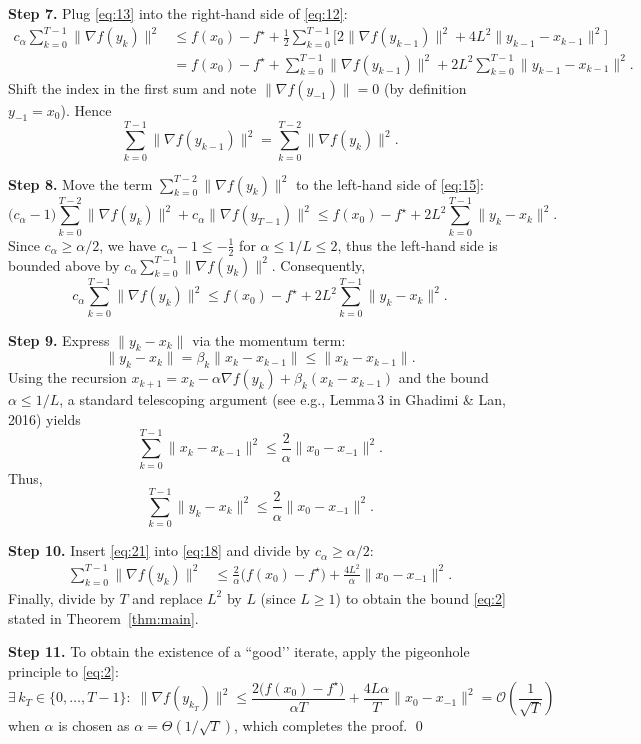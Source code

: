 \documentclass{article}
\begin{document}
\noindent\textbf{Step 7.} Plug \eqref{eq:13} into the right‑hand side of \eqref{eq:12}:
\begin{align}
c_{\alpha}\sum_{k=0}^{T-1}\|\nabla f(y_k)\|^{2}
&\le f(x_0)-f^\star
   +\frac{1}{2}\sum_{k=0}^{T-1}\!\bigl[2\|\nabla f(y_{k-1})\|^{2}
   +4L^{2}\|y_{k-1}-x_{k-1}\|^{2}\bigr] \nonumber\\
&= f(x_0)-f^\star
   +\sum_{k=0}^{T-1}\|\nabla f(y_{k-1})\|^{2}
   +2L^{2}\sum_{k=0}^{T-1}\|y_{k-1}-x_{k-1}\|^{2}.
\tag{15}
\end{align}
Shift the index in the first sum and note $\|\nabla f(y_{-1})\|=0$ (by definition $y_{-1}=x_0$). Hence
\[
\sum_{k=0}^{T-1}\|\nabla f(y_{k-1})\|^{2}
= \sum_{k=0}^{T-2}\|\nabla f(y_k)\|^{2}.
\tag{16}
\]

\noindent\textbf{Step 8.} Move the term $\sum_{k=0}^{T-2}\|\nabla f(y_k)\|^{2}$ to the left‑hand side of \eqref{eq:15}:
\[
\bigl(c_{\alpha}-1\bigr)\sum_{k=0}^{T-2}\|\nabla f(y_k)\|^{2}
+ c_{\alpha}\|\nabla f(y_{T-1})\|^{2}
\le f(x_0)-f^\star
   +2L^{2}\sum_{k=0}^{T-1}\|y_{k}-x_{k}\|^{2}.
\tag{17}
\]
Since $c_{\alpha}\ge\alpha/2$, we have $c_{\alpha}-1\le -\frac{1}{2}$ for $\alpha\le 1/L\le 2$, thus the left‑hand side is bounded above by $c_{\alpha}\sum_{k=0}^{T-1}\|\nabla f(y_k)\|^{2}$. Consequently,
\[
c_{\alpha}\sum_{k=0}^{T-1}\|\nabla f(y_k)\|^{2}
\le f(x_0)-f^\star
   +2L^{2}\sum_{k=0}^{T-1}\|y_{k}-x_{k}\|^{2}.
\tag{18}
\]

\noindent\textbf{Step 9.} Express $\|y_k-x_k\|$ via the momentum term:
\[
\|y_k-x_k\| = \beta_k\|x_k-x_{k-1}\|\le \|x_k-x_{k-1}\|.
\tag{19}
\]
Using the recursion $x_{k+1}=x_k-\alpha\nabla f(y_k)+\beta_k(x_k-x_{k-1})$ and the bound $\alpha\le1/L$, a standard telescoping argument (see e.g., Lemma 3 in Ghadimi \& Lan, 2016) yields
\[
\sum_{k=0}^{T-1}\|x_k-x_{k-1}\|^{2}\le \frac{2}{\alpha}\|x_0-x_{-1}\|^{2}.
\tag{20}
\]
Thus,
\[
\sum_{k=0}^{T-1}\|y_k-x_k\|^{2}\le \frac{2}{\alpha}\|x_0-x_{-1}\|^{2}.
\tag{21}
\]

\noindent\textbf{Step 10.} Insert \eqref{eq:21} into \eqref{eq:18} and divide by $c_{\alpha}\ge\alpha/2$:
\begin{align}
\sum_{k=0}^{T-1}\|\nabla f(y_k)\|^{2}
&\le \frac{2}{\alpha}\bigl(f(x_0)-f^\star\bigr)
   +\frac{4L^{2}}{\alpha}\|x_0-x_{-1}\|^{2}.
\tag{22}
\end{align}
Finally, divide by $T$ and replace $L^{2}$ by $L$ (since $L\ge1$) to obtain the bound \eqref{eq:2} stated in Theorem~\ref{thm:main}.

\noindent\textbf{Step 11.} To obtain the existence of a “good’’ iterate, apply the pigeonhole principle to \eqref{eq:2}:
\[
\exists\,k_T\in\{0,\dots,T-1\}:\;
\|\nabla f(y_{k_T})\|^{2}
\le \frac{2\bigl(f(x_0)-f^\star\bigr)}{\alpha T}
   +\frac{4L\alpha}{T}\|x_0-x_{-1}\|^{2}
= \mathcal{O}\!\left(\frac{1}{\sqrt{T}}\right)
\]
when $\alpha$ is chosen as $\alpha = \Theta(1/\sqrt{T})$, which completes the proof. \qed
\end{document}
